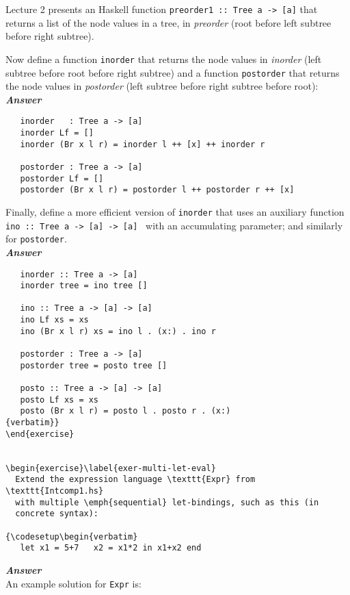 \documentclass[a4paper]{article}
\begin{document}
\begin{exercise}\label{exer-tree-traversal}
  Lecture 2 presents an Haskell function \texttt{preorder1 ::\ Tree a ->
    [a]} that returns a list of the node values in a tree, in
  \emph{preorder} (root before left subtree before right subtree).
  
  Now define a function \texttt{inorder} that returns the node values
  in \emph{inorder} (left subtree before root before right subtree)
  and a function \texttt{postorder} that returns the node values in
  \emph{postorder} (left subtree before right subtree before root):\\
  
\noindent
\textbf{\emph{Answer}}
{\codesetup\begin{verbatim}
   inorder   : Tree a -> [a]
   inorder Lf = []
   inorder (Br x l r) = inorder l ++ [x] ++ inorder r
   
   postorder : Tree a -> [a]
   postorder Lf = []
   postorder (Br x l r) = postorder l ++ postorder r ++ [x]
\end{verbatim}}

\noindent 
Finally, define a more efficient version of \texttt{inorder} that
  uses an auxiliary function \texttt{ino ::\ Tree a -> [a] -> [a]
    } with an accumulating parameter; and similarly for
  \texttt{postorder}.  \\
  
  \noindent
\textbf{\emph{Answer}}
{\codesetup\begin{verbatim}
   inorder :: Tree a -> [a]
   inorder tree = ino tree []
   
   ino :: Tree a -> [a] -> [a]
   ino Lf xs = xs
   ino (Br x l r) xs = ino l . (x:) . ino r
   
   postorder : Tree a -> [a]
   postorder tree = posto tree []
   
   posto :: Tree a -> [a] -> [a]
   posto Lf xs = xs
   posto (Br x l r) = posto l . posto r . (x:)
{verbatim}}
\end{exercise}


\begin{exercise}\label{exer-multi-let-eval}
  Extend the expression language \texttt{Expr} from \texttt{Intcomp1.hs}
  with multiple \emph{sequential} let-bindings, such as this (in
  concrete syntax):

{\codesetup\begin{verbatim}
   let x1 = 5+7   x2 = x1*2 in x1+x2 end
\end{verbatim}}

\noindent
\textbf{\emph{Answer}}\\
An example solution for \texttt{Expr} is: 


\end{exercise}
\end{document}
